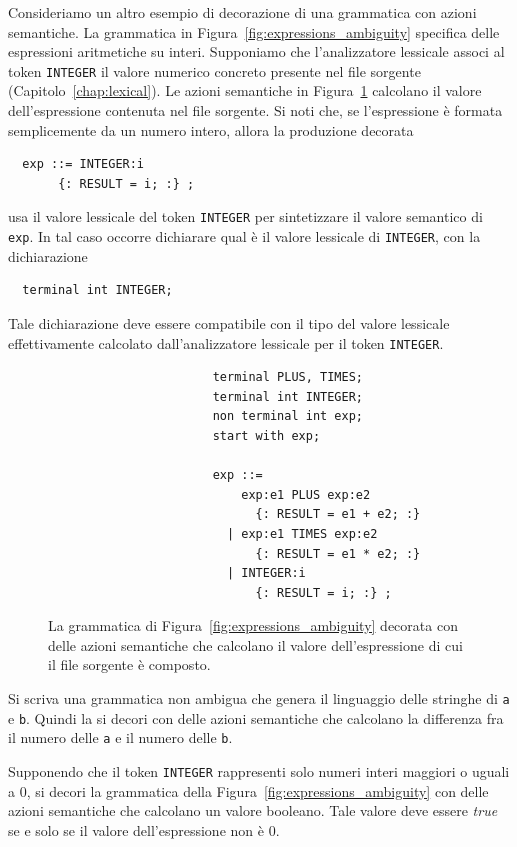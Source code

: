 Consideriamo un altro esempio di decorazione di una grammatica
con azioni semantiche. La grammatica in
Figura~\ref{fig:expressions_ambiguity} specifica delle espressioni aritmetiche
su interi. Supponiamo che l'analizzatore lessicale associ al token
\texttt{INTEGER} il valore numerico concreto presente nel file
sorgente (Capitolo~\ref{chap:lexical}). Le azioni semantiche in
Figura~\ref{fig:expressions_decoration} calcolano il valore dell'espressione
contenuta nel file sorgente. Si noti che, se l'espressione \`e formata
semplicemente da un numero intero, allora la produzione decorata
%
\begin{verbatim}
  exp ::= INTEGER:i
       {: RESULT = i; :} ;
\end{verbatim}
%
usa il valore lessicale del token \texttt{INTEGER} per sintetizzare il
valore semantico di \texttt{exp}. In tal caso occorre dichiarare
qual \`e il valore lessicale di \texttt{INTEGER}, con la dichiarazione
%
\begin{verbatim}
  terminal int INTEGER;
\end{verbatim}
%
Tale dichiarazione deve essere compatibile con il tipo del valore
lessicale effettivamente calcolato dall'analizzatore lessicale per il token
\texttt{INTEGER}.

\begin{figure}[t]
\begin{verbatim}
                       terminal PLUS, TIMES;
                       terminal int INTEGER;
                       non terminal int exp;
                       start with exp;

                       exp ::=
                           exp:e1 PLUS exp:e2
                             {: RESULT = e1 + e2; :}
                         | exp:e1 TIMES exp:e2
                             {: RESULT = e1 * e2; :}
                         | INTEGER:i
                             {: RESULT = i; :} ;
\end{verbatim}
\caption{La grammatica di Figura~\ref{fig:expressions_ambiguity}
         decorata con delle
         azioni semantiche che calcolano il valore dell'espressione di cui
         il file sorgente \`e composto.}
  \label{fig:expressions_decoration}
\end{figure}

\begin{exercise}\label{ex:decoration1}
Si scriva una grammatica non ambigua che genera il linguaggio delle
stringhe di \texttt{a} e \texttt{b}. Quindi la si decori con delle
azioni semantiche che calcolano la differenza fra il numero delle \texttt{a}
e il numero delle \texttt{b}.
\end{exercise}
%
\begin{exercise}\label{ex:decoration2}
Supponendo che il token \texttt{INTEGER} rappresenti solo numeri interi
maggiori o uguali a $0$, si decori la grammatica della
Figura~\ref{fig:expressions_ambiguity} con delle azioni semantiche che
calcolano un valore booleano. Tale valore deve essere \textit{true}
se e solo se il valore dell'espressione non \`e $0$.
\end{exercise}


